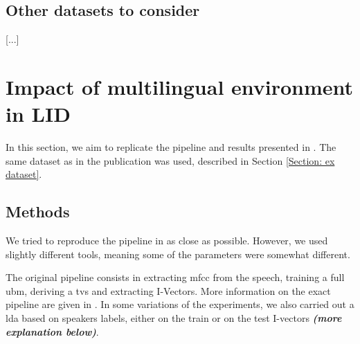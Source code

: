                                        
\subsection{Other datasets to consider}
[...]


\section{Impact of multilingual environment in LID}
 \label{Section: impact of multilingual in lid}

\bigskip

In this section, we aim to replicate the pipeline and results presented in \citep{carbajal2016language}. The same dataset as in the publication was used, described in  Section \ref{Section: ex dataset}. 

\bigskip
{}



\subsection{Methods}\label{Section: replication pipeline}

We tried to reproduce the pipeline in \citet{carbajal2016language} as close as possible.  However, we used slightly different tools, meaning some of the parameters were somewhat different. 

The original pipeline consists in extracting \acrfull{mfcc} from the speech, training a full \acrfull{ubm}, deriving a \acrfull{tvs} and extracting I-Vectors. More information on the exact pipeline are given in \citet{carbajal2016language}. In some variations of the experiments, we also carried out a \acrfull{lda} based on speakers labels, either on the train or on the test I-vectors \textbf{\textit{(more explanation below)}}. 

